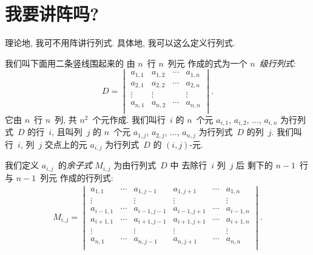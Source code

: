 \documentclass[../libro]{subfiles}
\begin{document}
\section{我要讲阵吗?}

理论地, 我可不用阵讲行列式.
具体地, 我可以这么定义行列式.

\begin{definition}
    我们叫下面用二条竖线围起来的%
    由 \(n\)~行 \(n\)~列元%
    作成的式为一个 \emph{\(n\)~级行列式}:
    \begin{equation}
        D =
        \begin{vmatrix}
            a_{1,1} & a_{1,2} & \cdots & a_{1,n} \\
            a_{2,1} & a_{2,2} & \cdots & a_{2,n} \\
            \vdots  & \vdots  & {}     & \vdots  \\
            a_{n,1} & a_{n,2} & \cdots & a_{n,n} \\
        \end{vmatrix}.
        \label{eq:C0201}
    \end{equation}
    它由 \(n\)~行 \(n\)~列, 共 \(n^2\)~个元作成.
    我们叫行~\(i\) 的 \(n\)~个元
    \(a_{i,1}\), \(a_{i,2}\), \(\dots\), \(a_{i,n}\)
    为行列式~\(D\) 的行~\(i\),
    且叫列~\(j\) 的 \(n\)~个元
    \(a_{1,j}\), \(a_{2,j}\), \(\dots\), \(a_{n,j}\)
    为行列式~\(D\) 的列~\(j\).
    我们叫行~\(i\), 列~\(j\) 交点上的元 \(a_{i,j}\)
    为行列式~\(D\) 的 \((i,j)\)-元.

    我们定义 \(a_{i,j}\)~的\emph{余子式} \(M_{i,j}\)
    为由行列式~\(D\) 中%
    去除行~\(i\) 列~\(j\) 后%
    剩下的 \(n-1\)~行与 \(n-1\)~列元%
    作成的行列式:
    \begin{align*}
        M_{i,j} =
        \begin{vmatrix}
            a_{1,1}     & \cdots & a_{1,j-1}   &
            a_{1,j+1}   & \cdots & a_{1,n}       \\
            \vdots      & {}     & \vdots      &
            \vdots      & {}     & \vdots        \\
            a_{i-1,1}   & \cdots & a_{i-1,j-1} &
            a_{i-1,j+1} & \cdots & a_{i-1,n}     \\
            a_{i+1,1}   & \cdots & a_{i+1,j-1} &
            a_{i+1,j+1} & \cdots & a_{i+1,n}     \\
            \vdots      & {}     & \vdots      &
            \vdots      & {}     & \vdots        \\
            a_{n,1}     & \cdots & a_{n,j-1}   &
            a_{n,j+1}   & \cdots & a_{n,n}       \\
        \end{vmatrix}.
    \end{align*}


\end{definition}
\end{document}
